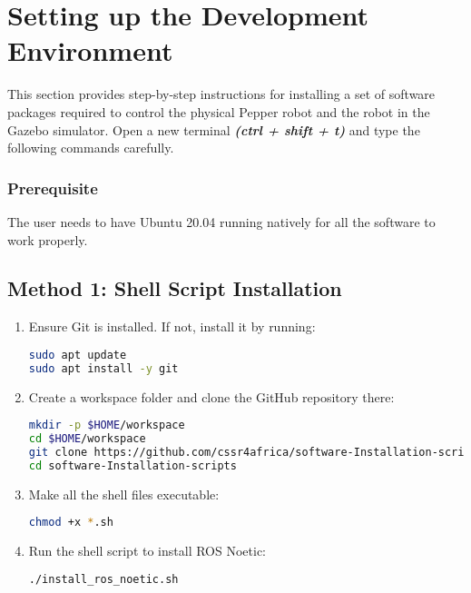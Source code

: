 \documentclass{CSSRforAfrica}
\begin{document}
\section{Setting up the Development Environment}
{
\label{devenv}
This section provides step-by-step instructions for installing a set of software packages required to control the physical Pepper robot and the robot in the Gazebo simulator. Open a new terminal \textit{\textbf{(ctrl + shift + t)}} and type the following commands carefully. 

\subsubsection*{Prerequisite}

{The user needs to have Ubuntu 20.04 running natively for all the software to work properly.} 

\vspace{1em}

\begingroup
{}

\subsection{Method 1: Shell Script Installation}

\begin{enumerate}
\item Ensure Git is installed. If not, install it by running:
\begin{lstlisting}[style=withoutNumbering, language=bash]
sudo apt update
sudo apt install -y git
\end{lstlisting}

\item Create a workspace folder and clone the GitHub repository there:
\begin{lstlisting}[style=withoutNumbering, language=bash]
mkdir -p $HOME/workspace
cd $HOME/workspace
git clone https://github.com/cssr4africa/software-Installation-scripts.git
cd software-Installation-scripts
\end{lstlisting}

\item Make all the shell files executable:
\begin{lstlisting}[style=withoutNumbering, language=bash]
chmod +x *.sh
\end{lstlisting}

\item Run the shell script to install ROS Noetic:
\begin{lstlisting}[style=withoutNumbering, language=bash]
./install_ros_noetic.sh
\end{lstlisting}


\end{enumerate}}
\end{document}
